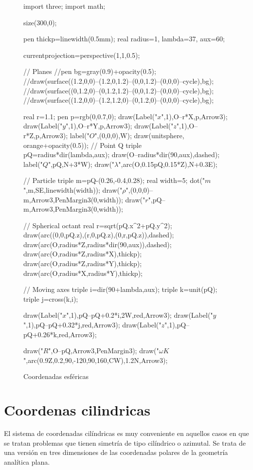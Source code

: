 \documentclass[a4paper]{book}
\begin{document}
\begin{figure}[!ht]
	\begin{asy}
import three;
import math;


size(300,0);

pen thickp=linewidth(0.5mm);
real radius=1, lambda=37, aux=60;

currentprojection=perspective(1,1,0.5);

// Planes
//pen bg=gray(0.9)+opacity(0.5);
//draw(surface((1.2,0,0)--(1.2,0,1.2)--(0,0,1.2)--(0,0,0)--cycle),bg);
//draw(surface((0,1.2,0)--(0,1.2,1.2)--(0,0,1.2)--(0,0,0)--cycle),bg);
//draw(surface((1.2,0,0)--(1.2,1.2,0)--(0,1.2,0)--(0,0,0)--cycle),bg);

real r=1.1;
pen p=rgb(0,0.7,0);
draw(Label("$x$",1),O--r*X,p,Arrow3);
draw(Label("$y$",1),O--r*Y,p,Arrow3);
draw(Label("$z$",1),O--r*Z,p,Arrow3);
label("$O$",(0,0,0),W);
draw(unitsphere, orange+opacity(0.5));
// Point Q
triple pQ=radius*dir(lambda,aux);
draw(O--radius*dir(90,aux),dashed);
label("$ Q$",pQ,N+3*W);
draw("$\lambda$",arc(O,0.15pQ,0.15*Z),N+0.3E);

// Particle
triple m=pQ-(0.26,-0.4,0.28);
real width=5;
dot("$m$",m,SE,linewidth(width));
draw("${\rho}$",(0,0,0)--m,Arrow3,PenMargin3(0,width));
draw("${r}$",pQ--m,Arrow3,PenMargin3(0,width));

// Spherical octant
real r=sqrt(pQ.x^2+pQ.y^2);
draw(arc((0,0,pQ.z),(r,0,pQ.z),(0,r,pQ.z)),dashed);
draw(arc(O,radius*Z,radius*dir(90,aux)),dashed);
draw(arc(O,radius*Z,radius*X),thickp);
draw(arc(O,radius*Z,radius*Y),thickp);
draw(arc(O,radius*X,radius*Y),thickp);

// Moving axes
triple i=dir(90+lambda,aux);
triple k=unit(pQ);
triple j=cross(k,i);

draw(Label("$x$",1),pQ--pQ+0.2*i,2W,red,Arrow3);
draw(Label("$y$",1),pQ--pQ+0.32*j,red,Arrow3);
draw(Label("$z$",1),pQ--pQ+0.26*k,red,Arrow3);

draw("${R}$",O--pQ,Arrow3,PenMargin3);
draw("$\omega{K}$",arc(0.9Z,0.2,90,-120,90,160,CW),1.2N,Arrow3);
	\end{asy}
	\caption{Coordenadas esféricas}
\end{figure}




\section{Coordenas cilindricas}

El sistema de coordenadas cilíndricas es muy conveniente en aquellos casos en que se tratan problemas que tienen simetría de tipo cilíndrico o azimutal. Se trata de una versión en tres dimensiones de las coordenadas polares de la geometría analítica plana.
\end{document}
